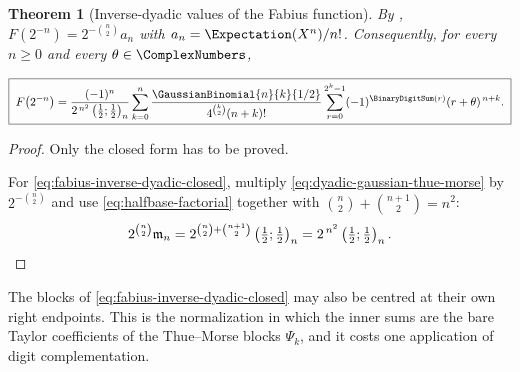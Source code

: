 \documentclass[11pt,a4paper,oneside,openany]{book}
\newtheorem{theorem}{Theorem}[chapter]
\theoremstyle{definition}
\theoremstyle{remark}
\begin{document}
\begin{theorem}[Inverse-dyadic values of the Fabius function]\label{thm:fabius-inverse-dyadic}
By , $F(2^{-n})=2^{-\binom n2}a_n$ with
$a_n=\Expectation(X^n)/n!$.  Consequently, for every $n\ge0$ and every
$\theta\in\ComplexNumbers$,

\begin{equation}\label{eq:fabius-inverse-dyadic-closed}
 \boxed{\;
 F\bigl(2^{-n}\bigr)
 =\frac{(-1)^n}{2^{\,n^2}\left(\frac12;\frac12\right)_n}
 \sum_{k=0}^{n}
 \frac{\GaussianBinomial{n}{k}{1/2}}{4^{\binom k2}(n+k)!}
 \sum_{r=0}^{2^k-1}(-1)^{\BinaryDigitSum(r)}(r+\theta)^{\,n+k}.\;}
\end{equation}
\end{theorem}

\begin{proof}
Only the closed form has to be proved.

For \eqref{eq:fabius-inverse-dyadic-closed}, multiply \eqref{eq:dyadic-gaussian-thue-morse} by $2^{-\binom n2}$ and use \eqref{eq:halfbase-factorial} together with $\binom n2+\binom{n+1}{2}=n^2$:
\[
 2^{\binom n2}\mathfrak m_n
 =2^{\binom n2+\binom{n+1}{2}}\left(\tfrac12;\tfrac12\right)_n
 =2^{\,n^2}\left(\tfrac12;\tfrac12\right)_n . \qedhere
\]
\end{proof}

The blocks of \eqref{eq:fabius-inverse-dyadic-closed} may also be centred at their own right endpoints.  This is the normalization in which the inner sums are the bare Taylor coefficients of the Thue--Morse blocks $\Psi_k$, and it costs one application of digit complementation.
\end{document}
